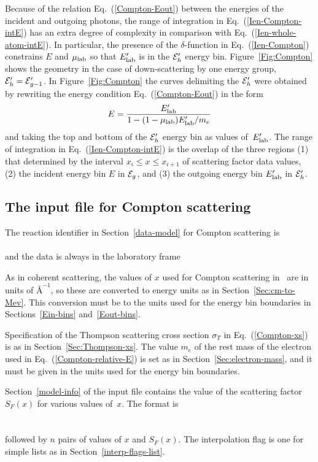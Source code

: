 Because of the relation Eq.~(\ref{Compton-Eout}) between the energies
of the incident and outgoing photons, the range of integration in 
Eq.~(\ref{Ien-Compton-intE}) has an extra degree of complexity in
comparison with Eq.~(\ref{Ien-whole-atom-intE}).  In particular,
the presence of the 
$\delta$-function in Eq.~(\ref{Ien-Compton}) constrains $E$ and
$\mu_{\text{lab}}$ so that $E_{\text{lab}}'$ is in the ${\cal E}_h'$ energy bin.  Figure~\ref{Fig:Compton}
shows the geometry in the case of down-scattering by one
energy group, ${\cal E}_h' = {\cal E}'_{g-1}$.  In Figure~\ref{Fig:Compton} the curves
delimiting the ${\cal E}_h'$ were obtained by rewriting the energy
condition Eq.~(\ref{Compton-Eout}) in the form
$$
  E = \frac{E_{\text{lab}}'}{1 - (1 - \mu_{\text{lab}})E_{\text{lab}}'/m_e}
$$
and taking the top and bottom of the
${\cal E}_h'$ energy bin as values of~$E_{\text{lab}}'$.  The range of integration in
Eq.~(\ref{Ien-Compton-intE}) is the overlap of the three regions
(1) that determined by the interval $x_i \le x \le x_{i+1}$
of scattering factor data values,
(2) the incident energy bin $E$ in ${\cal E}_g$, and
(3) the outgoing energy bin $E_{\text{lab}}'$ in ${\cal E}_h'$.

\subsection{The input file for Compton scattering}
The reaction identifier in Section~\ref{data-model} for
Compton scattering is\\
  \\
and the data is always in the laboratory frame\\

As in coherent scattering, the values of $x$ used for Compton
scattering in \xendl\ are in units of $\text{\AA}^{-1}$, so these are
converted to energy units as in Section~\ref{Sec:cm-to-Mev}.  This
conversion must be to the units used for the energy bin boundaries in
Sections~\ref{Ein-bins} and~\ref{Eout-bins}.

Specification of the Thompson scattering cross section $\sigma_T$
in Eq.~(\ref{Compton-xs}) is as in Section~\ref{Sec:Thompson-xs}.
The value $m_e$ of the rest mass of the electron used in
Eq.~(\ref{Compton-relative-E}) is set as
in Section~\ref{Sec:electron-mass}, and it must be given
in the units used for the energy bin boundaries.

Section~\ref{model-info} of the input file contains the value of the
scattering factor $S_F(x)$ for various values of~$x$.  The format is\\
    \\
    \\
followed by $n$ pairs of values of $x$ and $S_F(x)$.    The interpolation
flag is one for simple lists as in Section~\ref{interp-flags-list}.

